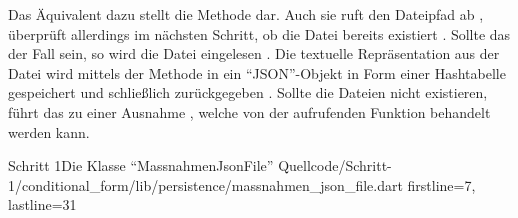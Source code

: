 Das Äquivalent dazu stellt die Methode   dar.
Auch sie ruft den Dateipfad ab , überprüft allerdings im nächsten Schritt, ob die Datei bereits existiert .
Sollte das der Fall sein, so wird die Datei eingelesen .
Die textuelle Repräsentation aus der Datei wird mittels der Methode  in ein \enquote{JSON}-Objekt in Form einer Hashtabelle gespeichert  und schließlich zurückgegeben .
Sollte die Dateien nicht existieren, führt das zu einer Ausnahme , welche von der aufrufenden Funktion behandelt werden kann.

\begin{alexlisting}{Schritt 1}{Die Klasse \enquote{MassnahmenJsonFile}}
  {Quellcode/Schritt-1/conditional_form/lib/persistence/massnahmen_json_file.dart}
  {firstline=7, lastline=31}
  \label{lst:Schritt1KlasseMassnahmenJsonFile}
\end{alexlisting}

